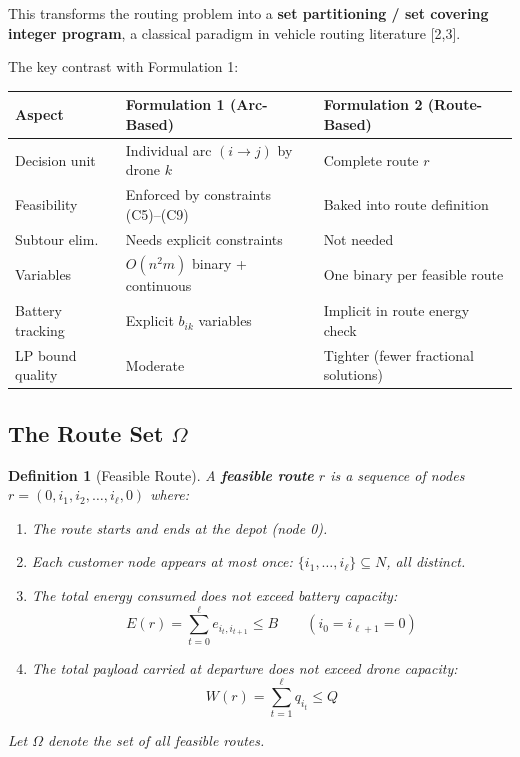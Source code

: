 \documentclass[12pt,a4paper]{article}
\newtheorem{definition}{Definition}
\begin{document}
This transforms the routing problem into a \textbf{set partitioning / set covering
integer program}, a classical paradigm in vehicle routing literature [2,3].

The key contrast with Formulation 1:

\begin{center}
\renewcommand{\arraystretch}{1.4}
\begin{tabular}{lll}
\toprule
Aspect & Formulation 1 (Arc-Based) & Formulation 2 (Route-Based) \\
\midrule
Decision unit & Individual arc $(i \to j)$ by drone $k$ & Complete route $r$ \\
Feasibility & Enforced by constraints (C5)--(C9) & Baked into route definition \\
Subtour elim. & Needs explicit constraints & Not needed \\
Variables & $O(n^2 m)$ binary + continuous & One binary per feasible route \\
Battery tracking & Explicit $b_{ik}$ variables & Implicit in route energy check \\
LP bound quality & Moderate & Tighter (fewer fractional solutions) \\
\bottomrule
\end{tabular}
\end{center}

\subsection{The Route Set $\Omega$}

\begin{definition}[Feasible Route]
A \textbf{feasible route} $r$ is a sequence of nodes
$r = (0, i_1, i_2, \ldots, i_\ell, 0)$ where:
\begin{enumerate}
  \item The route starts and ends at the depot (node 0).
  \item Each customer node appears at most once: $\{i_1, \ldots, i_\ell\} \subseteq N$,
  all distinct.
  \item The total energy consumed does not exceed battery capacity:
  \[
    E(r) = \sum_{t=0}^{\ell} e_{i_t, i_{t+1}} \leq B
    \qquad (i_0 = i_{\ell+1} = 0)
  \]
  \item The total payload carried at departure does not exceed drone capacity:
  \[
    W(r) = \sum_{t=1}^{\ell} q_{i_t} \leq Q
  \]
\end{enumerate}
Let $\Omega$ denote the set of all feasible routes.
\end{definition}
\end{document}
